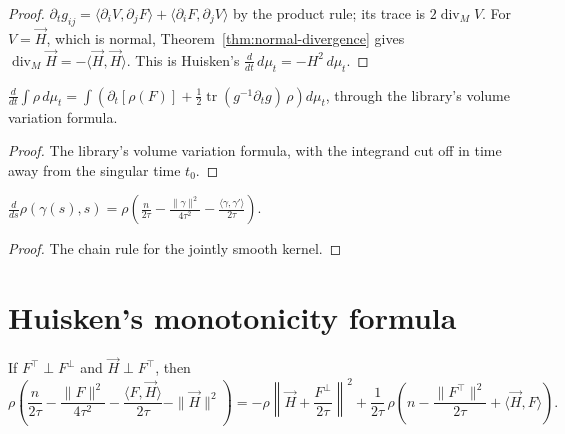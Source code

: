 \begin{proof}
  \leanok
  $\partial_t g_{ij} = \langle \partial_i V, \partial_j F\rangle + \langle \partial_i F, \partial_j V\rangle$ by the product rule; its trace is $2\operatorname{div}_M V$. For $V = \vec H$, which is normal, Theorem~\ref{thm:normal-divergence} gives $\operatorname{div}_M \vec H = -\langle \vec H, \vec H\rangle$. This is Huisken's $\frac{d}{dt}\,d\mu_t = -H^2\,d\mu_t$.
\end{proof}

\begin{theorem}
  \label{thm:transport}
  \leanok
  $\frac{d}{dt}\int \rho\,d\mu_t = \int \left(\partial_t[\rho(F)] +
  \tfrac12 \operatorname{tr}(g^{-1}\partial_t g)\,\rho\right)d\mu_t$, through the
  library's volume variation formula.
\end{theorem}

\begin{proof}
  \leanok
  The library's volume variation formula, with the integrand cut off in time away from the singular time $t_0$.
\end{proof}

\begin{lemma}
  \label{lem:kernel-curve}
  \leanok
  $\frac{d}{ds}\rho(\gamma(s), s) = \rho\left(\frac{n}{2\tau} - \frac{\|\gamma\|^2}{4\tau^2}
  - \frac{\langle \gamma, \gamma'\rangle}{2\tau}\right)$.
\end{lemma}

\begin{proof}
  \leanok
  The chain rule for the jointly smooth kernel.
\end{proof}

\section{Huisken's monotonicity formula}

\begin{lemma}
  \label{lem:pointwise-identity}
  \leanok
  If $F^\top \perp F^\perp$ and $\vec H \perp F^\top$, then
  \[
    \rho\left(\frac{n}{2\tau} - \frac{\|F\|^2}{4\tau^2} - \frac{\langle F, \vec H\rangle}{2\tau}
      - \|\vec H\|^2\right)
    = -\rho\left\|\vec H + \frac{F^\perp}{2\tau}\right\|^2
      + \frac{1}{2\tau}\,\rho\left(n - \frac{\|F^\top\|^2}{2\tau} + \langle \vec H, F\rangle\right).
  \]
\end{lemma}

